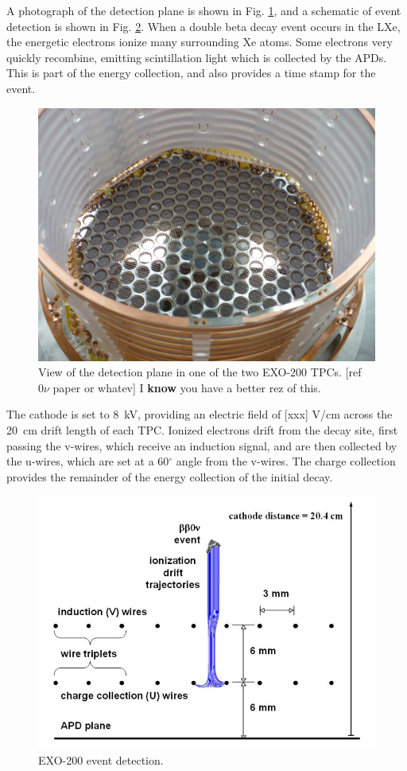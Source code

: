 A photograph of the detection plane is shown in Fig. \ref{fig:tpcphoto}, and a schematic of event detection is shown in Fig. \ref{fig:detectionplane}.  When a double beta decay event occurs in the LXe, the energetic electrons ionize many surrounding Xe atoms.  Some electrons very quickly recombine, emitting scintillation light which is collected by the APDs.  This is part of the energy collection, and also provides a time stamp for the event.  

\begin{figure}[H]
	\centering
	\includegraphics[width=.7\textwidth]{figures/TPCphoto.jpeg}
	\caption{View of the detection plane in one of the two EXO-200 TPCs.  [ref $0\nu$ paper or whatev]  {\color{red}I \textbf{know} you have a better rez of this.}}
\label{fig:tpcphoto}
\end{figure}

The cathode is set to 8~kV, providing an electric field of [xxx] V/cm across the 20~cm drift length of each TPC.  Ionized electrons drift from the decay site, first passing the v-wires, which receive an induction signal, and are then collected by the u-wires, which are set at a  {\color{red}60$^\circ$} angle from the v-wires.  The charge collection provides the remainder of the energy collection of the initial decay.

\begin{figure}[H]
	\centering
	\includegraphics[width=.7\textwidth]{figures/anodecathodedriftcharges.png}
	\caption{EXO-200 event detection.  }
\label{fig:detectionplane}
\end{figure}


